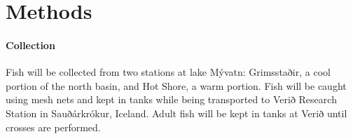 \documentclass[12pt]{extarticle}
\begin{document}



\section*{Methods}

\paragraph{Collection}
Fish will be collected from two stations at lake M\'yvatn: Grimsstaðir, a cool portion of the north basin, and Hot Shore, a warm portion. Fish will be caught using mesh nets and kept in tanks while being transported to Verið Research Station in Sauðárkrókur, Iceland. Adult fish will be kept in tanks at Verið until crosses are performed.
\end{document}
